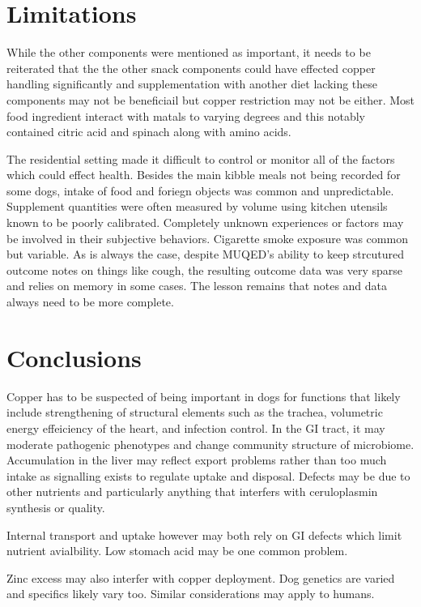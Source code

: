 \documentclass[aps,secnumarabic,balancelastpage,amsmath,amssymb,nofootinbib]{revtex4}
\begin{document}
\section{Limitations}
While the other components were mentioned as important,
it needs to be reiterated that the 
the other snack components could have effected copper handling
significantly and supplementation with another diet lacking
these components may not be beneficiail but copper restriction
may not be either. Most food ingredient interact with matals 
to varying degrees and this notably contained citric acid
and spinach along with amino acids. 

The residential setting made it difficult to control or monitor
all of the factors which could effect health. Besides the main
kibble meals not being recorded for some dogs, intake of food
and foriegn objects was common and unpredictable. 
Supplement quantities were often measured by volume using kitchen
utensils known to be poorly calibrated. 
Completely unknown experiences or factors may be involved in their
subjective behaviors.  Cigarette smoke exposure was common
but variable.
As is always the case, despite MUQED's ability to keep strcutured
outcome notes on things like cough, the resulting outcome
data was very sparse and relies on memory in some cases.
The lesson remains that notes and data always need to be
more complete. 



\section{Conclusions}
Copper has to be suspected of being important in dogs for 
functions that likely
include strengthening  of structural elements such as the trachea,
volumetric energy effeiciency of the heart, and infection control.
In the GI tract, it may moderate pathogenic phenotypes and
change community structure of microbiome. 
Accumulation in the liver may reflect export problems
rather than too much intake as signalling exists to
regulate uptake and disposal. Defects may be due to other nutrients
and particularly anything that interfers with ceruloplasmin 
synthesis or quality. 

Internal transport and uptake however may both rely on 
GI defects which limit nutrient avialbility. Low stomach
acid may be one common problem. 

Zinc excess may also interfer with copper
deployment.
Dog genetics are varied and specifics likely vary too.
Similar considerations may apply to humans. 
\end{document}
